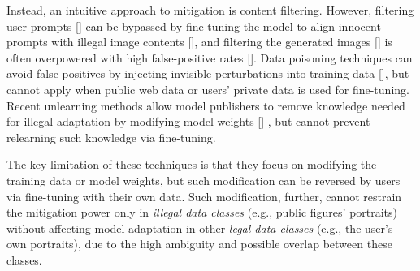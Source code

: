 \documentclass{article}
\begin{document}
Instead, an intuitive approach to mitigation is content filtering. However, filtering user prompts [] can be bypassed by fine-tuning the model to align innocent prompts with illegal image contents [], and filtering the generated images [] is often overpowered with high false-positive rates []. Data poisoning techniques can avoid false positives by injecting invisible perturbations into training data [], but cannot apply when public web data or users' private data is used for fine-tuning. Recent unlearning methods allow model publishers to remove knowledge needed for illegal adaptation by modifying model weights [] , but cannot prevent relearning such knowledge via fine-tuning. 






The key limitation of these techniques is that they focus on modifying the training data or model weights, but such modification can be reversed by users via fine-tuning with their own data. Such modification, further, cannot restrain the mitigation power only in \emph{illegal data classes} (e.g., public figures' portraits) without affecting model adaptation in other \emph{legal data classes} (e.g., the user's own portraits), due to the high ambiguity and possible overlap between these classes.
\end{document}
